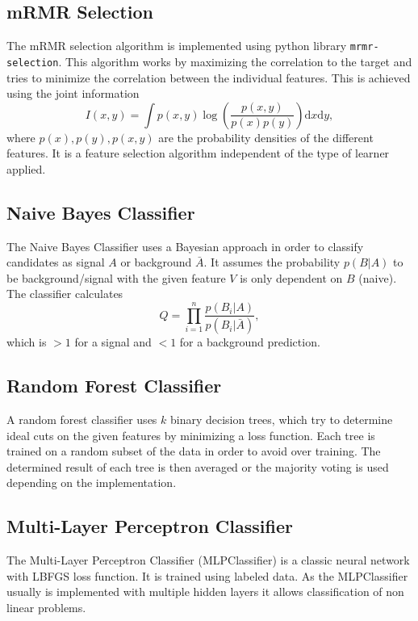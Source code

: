 \subsection{mRMR Selection}
\label{sec:mRmR}
The mRMR selection algorithm is implemented using python library \texttt{mrmr-selection}. This algorithm works by maximizing the correlation to the target and tries to minimize the correlation between the individual features. This is achieved using the joint information 
\begin{equation*}
	I(x,y) = \int p(x,y)\log\left(\frac{p(x,y)}{p(x)p(y)}\right)\mathrm{d}x\mathrm{d}y,
\end{equation*}
where $p(x),p(y),p(x,y)$ are the probability densities of the different features. It is a feature selection algorithm independent of the type of learner applied.

\subsection{Naive Bayes Classifier}
The Naive Bayes Classifier uses a Bayesian approach in order to classify candidates as signal $A$ or background $\bar{A}$. It assumes the probability $p(B|A)$ to be background/signal with the given feature $V$ is only dependent on $B$ (naive). The classifier calculates
\begin{equation*}
	Q = \prod_{i=1}^{n} \frac{p(B_i|A)}{p(B_i|\bar{A})},
\end{equation*}
which is $> 1$ for a signal and $< 1$ for a background prediction.

\subsection{Random Forest Classifier}
A random forest classifier uses $k$ binary decision trees, which try to determine ideal cuts on the given features by minimizing a loss function. Each tree is trained on a random subset of the data in order to avoid over training. The determined result of each tree is then averaged or the majority voting is used depending on the implementation. 

\subsection{Multi-Layer Perceptron Classifier}
The Multi-Layer Perceptron Classifier (MLPClassifier) is a classic neural network with LBFGS loss function. It is trained using labeled data. As the MLPClassifier usually is implemented with multiple hidden layers it allows classification of non linear problems.

